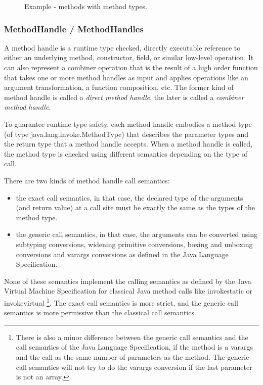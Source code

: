 \documentclass{sig-alternate}
\begin{document}
      \begin{figure}[!h]
        \centering \vspace{-1.5em}
        \caption{Example - methods with method types.}\vspace{-1em}
        \label{fooMTS}
      \end{figure}

    \subsubsection{MethodHandle / MethodHandles}
      \label{MH}

      A method handle is a runtime type checked, directly executable reference to
      either an underlying method, constructor, field, or similar low-level operation.
      It can also represent a combiner operation that is the result of a high order function
      that takes one or more method handles as input and applies operations like an argument transformation,
      a function composition, etc.
      The former kind of method handle is called a {\it direct method handle},
      the later is called a {\it combiner method handle}.

      To guarantee runtime type safety, each method handle embodies a method type (of type java.lang.invoke.MethodType)
      that describes the parameter types and the return type that a method handle accepts.
      When a method handle is called, the method type is checked using different semantics depending on the
      type of call.

      There are two kinds of method handle call semantics:
      \begin{itemize}
        \item the exact call semantics, in that case, the declared type of the arguments (and return value) at a call site
              must be exactly the same as the types of the method type.
        \item the generic call semantics, in that case, the arguments can be converted using subtyping conversions,
              widening primitive conversions, boxing and unboxing conversions and varargs conversions
              as defined in the Java Language Specification.
      \end{itemize}
      None of these semantics implement the calling semantics as defined by the Java Virtual Machine Specification
      for classical Java method calls like invokestatic or invokevirtual
      \footnote{There is also a minor difference between the generic call semantics and the call semantics of
        the Java Language Specification, if the method is a varargs and the call as the same number of parameters as the method.
        The generic call semantics will not try to do the varargs conversion if the last parameter is not an array.}.
      The exact call semantics is more strict, and the generic call semantics is more permissive than the classical call semantics.
\end{document}
